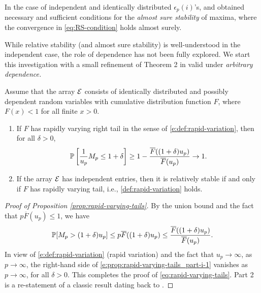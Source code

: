 In the case of independent and identically distributed $\epsilon_p(i)$'s, \citet{barndorff1963limit} and \citet{resnick1973almost} obtained necessary and sufficient conditions for the \emph{almost sure stability} of maxima, where the convergence in \eqref{eq:RS-condition} holds almost surely. 

While relative stability (and almost sure stability) is well-understood in the independent case, the role of dependence has not been fully explored.
We start this investigation with a small refinement of Theorem 2 in \citet{gnedenko1943distribution} valid under {\em
arbitrary dependence.}

\begin{proposition} \label{prop:rapid-varying-tails}
Assume that the array ${\cal E}$ consists of identically distributed and possibly dependent random 
variables with cumulative distribution function $F$, where $F(x)<1$ for all finite $x>0$. 
\begin{enumerate}
    \item If $F$ has rapidly varying right tail in the sense of \eqref{e:def:rapid-variation}, then for all $\delta>0$,
        \begin{equation} \label{eq:rapid-varying-tails}
            \P\left[\frac{1}{u_p} M_p\le1+\delta\right] \ge 1 - \frac{\overline F((1+\delta)u_p)}{\overline F(u_p)} \to 1.
        \end{equation}
    \item If the array ${\cal E}$ has independent entries, then it is relatively stable if and only if $F$ has rapidly varying tail, i.e., \eqref{def:rapid-variation} holds.
    \label{prop:rapid-varying-tails_part-ii}
\end{enumerate}
\end{proposition}

\begin{proof}[Proof of Proposition \ref{prop:rapid-varying-tails}] 
By the union bound and the fact that 
$p\overline F(u_p) \le 1$, we have
\begin{align}\label{e:prop:rapid-varying-tails_part-i-1}
\P [ M_p > (1+\delta)u_p] \le p \overline F((1+\delta)u_p)
 \le \frac{\overline F((1+\delta)u_p)}{\overline F(u_p)}.
\end{align}
In view of \eqref{e:def:rapid-variation} (rapid variation) and the fact that $u_p\to\infty$, as $p\to\infty$, the right-hand side of \eqref{e:prop:rapid-varying-tails_part-i-1} vanishes 
as $p\to\infty$, for all $\delta>0$.  This completes the proof of \eqref{eq:rapid-varying-tails}. Part 2 is a re-statement of a classic result dating back to \cite{gnedenko1943distribution}.
\end{proof}

